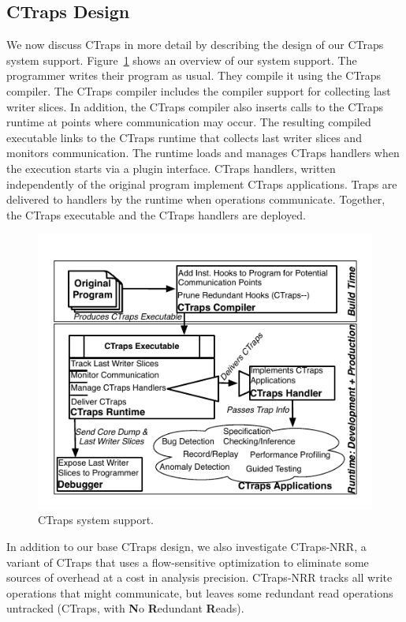 \documentclass[preprint,9pt]{sigplanconf}
\newcommand{\ctraps}{CTraps\xspace}
\newcommand{\ctrapsmm}{CTraps-NRR\xspace}
\begin{document}
\subsection{\ctraps Design}

We now discuss \ctraps in more detail by describing the design of our \ctraps
system support.  Figure~\ref{fig:systemdiagram} shows an overview of our system
support.  The programmer writes their program as usual.  They compile it using
the \ctraps compiler. The \ctraps compiler includes the compiler support for
collecting last writer slices.  In addition, the \ctraps compiler also inserts
calls to the \ctraps runtime at points where communication may occur.  The
resulting compiled executable links to the \ctraps runtime that collects last
writer slices and monitors communication.  The runtime loads and manages \ctraps
handlers when the execution starts via a plugin interface.  \ctraps handlers,
written independently of the original program implement \ctraps applications.
Traps are delivered to handlers by the runtime when operations communicate.
Together, the \ctraps executable and the \ctraps handlers are deployed.


\begin{figure}[htb]
\centering
\includegraphics[width=.90\columnwidth]{figs/SystemDiagram.pdf}
\caption{\label{fig:systemdiagram}CTraps system support.}
\end{figure}


In addition to our base \ctraps design, we also investigate \ctrapsmm, a
variant of \ctraps that uses a flow-sensitive optimization to eliminate some
sources of overhead at a cost in analysis precision. \ctrapsmm tracks all write
operations that might communicate, but leaves some redundant read operations
untracked (\ctraps, with {\bf N}o {\bf R}edundant {\bf R}eads).  
\end{document}
